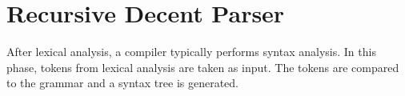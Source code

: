\documentclass[thesis]{hmcposter}
\begin{document}
\begin{poster}
\begin{figure}
\begin{center}
\hspace{0.4in}
\end{center}
\end{figure}

\section{Recursive Decent Parser}
After lexical analysis, a compiler typically performs syntax analysis. In this phase, tokens from lexical analysis are taken as input. The tokens are compared to the grammar and a syntax tree is generated. 


\end{poster}
\end{document}
